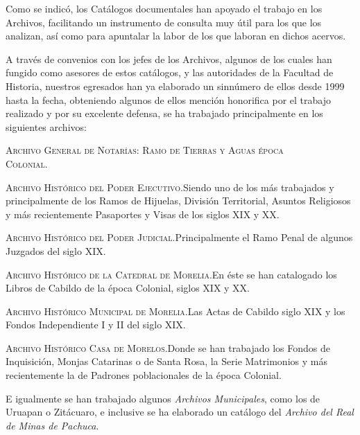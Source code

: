\bigskip
{}

\noindent Como se indicó, los Catálogos documentales han apoyado el 
trabajo en los Archivos, facilitando un instrumento de consulta muy útil 
para los que los analizan, así como para apuntalar la labor de los que 
laboran en dichos acervos.

A través de convenios con los jefes de los Archivos, algunos de los 
cuales han fungido como asesores de estos catálogos, y las autoridades 
de la Facultad de Historia, nuestros egresados han ya elaborado un 
sinnúmero de ellos desde 1999 hasta la fecha, obteniendo algunos de 
ellos mención honorifica por el trabajo realizado y por su excelente 
defensa, se ha trabajado principalmente en los siguientes archivos: 

{\scshape Archivo General de Notarías: Ramo de Tierras y Aguas época\\ Colonial}.

{\scshape Archivo Histórico del Poder Ejecutivo}.\quad Siendo uno de los más trabajados 
y principalmente de los Ramos de Hijuelas, División Territorial, 
Asuntos Religiosos y más recientemente Pasaportes y Visas de los siglos 
XIX y XX\@.

{\scshape Archivo Histórico del Poder Judicial}.\quad Principalmente el Ramo Penal 
de algunos Juzgados del siglo XIX\@.

{\scshape Archivo Histórico de la Catedral de Morelia}.\quad En éste se han 
catalogado los Libros de Cabildo de la época Colonial, siglos XIX y XX\@.

{\scshape Archivo Histórico Municipal de Morelia}.\quad Las Actas de Cabildo siglo XIX 
y los Fondos Independiente I y II del siglo XIX\@.
 
{\scshape Archivo Histórico Casa de Morelos}.\quad Donde se han trabajado los Fondos de 
Inquisición, Monjas Catarinas o de Santa Rosa, la Serie Matrimonios y 
más recientemente la de Padrones poblacionales de la época Colonial.

E igualmente se han trabajado algunos {\itshape Archivos Municipales\/}, como los de 
Uruapan o Zitácuaro, e inclusive se ha elaborado un catálogo del {\itshape Archivo del 
Real de Minas de Pachuca\/}.

